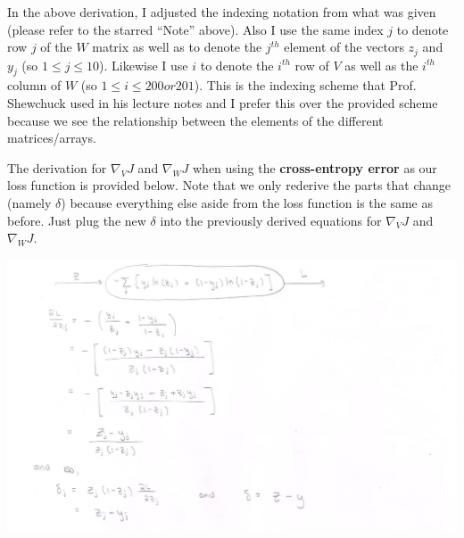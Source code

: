 \documentclass{article}
\begin{document}
In the above derivation, I adjusted the indexing notation from what was given (please refer to the starred ``Note'' above). Also I use the same index $j$ to denote row $j$ of the $W$ matrix as well as to denote the $j^{th}$ element of the vectors $z_j$ and $y_j$ (so $1 \leq j \leq 10$). Likewise I use $i$ to denote the $i^{th}$ row of $V$ as well as the $i^{th}$ column of $W$ (so $1 \leq i \leq 200 or 201$). This is the indexing scheme that Prof. Shewchuck used in his lecture notes and I prefer this over the provided scheme because we see the relationship between the elements of the different matrices/arrays.

The derivation for $\nabla_V J$ and $\nabla_W J$ when using the \textbf{cross-entropy error} as our loss function is provided below. Note that we only rederive the parts that change (namely $\delta$) because everything else aside from the loss function is the same as before. Just plug the new $\delta$ into the previously derived equations for $\nabla_V J$ and $\nabla_W J$.
\begin{center}
\includegraphics[scale=0.4]{002}
\end{center}
\end{document}
